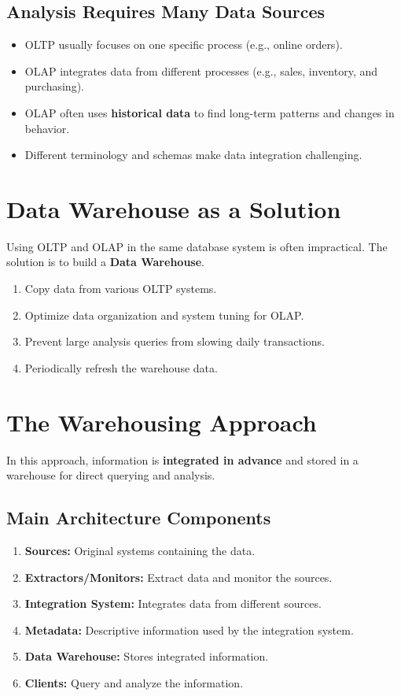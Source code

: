 \documentclass[12pt]{article}
\begin{document}
\subsection{Analysis Requires Many Data Sources}
\begin{itemize}
    \item OLTP usually focuses on one specific process (e.g., online orders).
    \item OLAP integrates data from different processes (e.g., sales, inventory, and purchasing).
    \item OLAP often uses \textbf{historical data} to find long-term patterns and changes in behavior.
    \item Different terminology and schemas make data integration challenging.
\end{itemize}
\section{Data Warehouse as a Solution}

Using OLTP and OLAP in the same database system is often impractical. The solution is to build a \textbf{Data Warehouse}.

\begin{enumerate}
    \item Copy data from various OLTP systems.
    \item Optimize data organization and system tuning for OLAP.
    \item Prevent large analysis queries from slowing daily transactions.
    \item Periodically refresh the warehouse data.
\end{enumerate}

\section{The Warehousing Approach}

In this approach, information is \textbf{integrated in advance} and stored in a warehouse for direct querying and analysis.

\subsection{Main Architecture Components}

\begin{enumerate}
    \item \textbf{Sources:} Original systems containing the data.
    \item \textbf{Extractors/Monitors:} Extract data and monitor the sources.
    \item \textbf{Integration System:} Integrates data from different sources.
    \item \textbf{Metadata:} Descriptive information used by the integration system.
    \item \textbf{Data Warehouse:} Stores integrated information.
    \item \textbf{Clients:} Query and analyze the information.
\end{enumerate}
\end{document}
